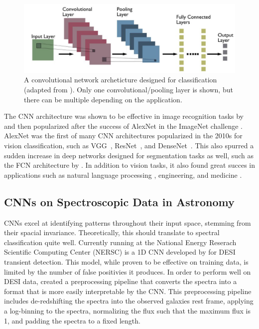 \begin{figure}[t]
    \centering
    \includegraphics[width=.8\linewidth]{figures/Typical-CNN-architecture.png}
    \caption[Traditional CNN Architecture for Classification]{A convolutional network archeticture designed for classification (adapted from \cite{kumar2022_cnn}). Only
    one convolutional/pooling layer is shown, but there can be multiple depending on the application. }
    \label{fig:CNN}
\end{figure}


The CNN architecture was shown to be effective in image recognition tasks by
\textcite{lecun2004} and then popularized after the success of AlexNet in the 
ImageNet challenge \parencite{krizhevsky2012}. AlexNet was the first of many CNN 
architectures popularized in the 2010s for vision classification, such as VGG~\parencite{Simonyan15}, 
ResNet~\parencite{he2016deep}, and DenseNet~\parencite{Huang2016}. This also spurred a sudden increase in deep networks designed 
for segmentation tasks as well, such as the FCN architecture by \textcite{Shelhamer2016}. In addition to vision tasks, it also found 
great succes in applications such as natural language processing \parencite{Kim2014}, engineering, and 
medicine \parencite{Kiranyaz2021}. 

\subsection{CNNs on Spectroscopic Data in Astronomy}
\label{sec:CNNspectra}
CNNs excel at identifying patterns throughout their input space, stemming from their spacial invariance. 
Theoretically, this should translate to spectral classification quite well. 
Currently running at the National Energy Reserach Scientific Computing Center (NERSC)
is a 1D CNN developed by \textcite{wasserman2021} for DESI transient detection.  This model, while
proven to be effective on training data, is limited by the number of false 
positivies it produces. In order to perform well on DESI data, \textcite{wasserman2021} 
created a preprocessing pipeline that converts the spectra into a format 
that is more easily interpretable by the CNN. This preprocessing pipeline includes 
de-redshifting the spectra into the observed galaxies rest frame, applying a 
log-binning to the spectra, normalizing the flux such that the maximum flux is 1, 
and padding the spectra to a fixed length. 


